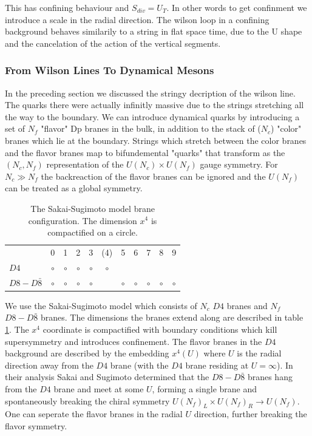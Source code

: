 \documentclass[11pt,a4paper]{article}
\begin{document}
This has confining behaviour and $S_{div}=U_T$. In other words to get confinment we introduce a scale in the radial direction. The wilson loop in a confining background behaves similarily to a string in flat space time, due to the U shape and the cancelation of the action of the vertical segments.

\FloatBarrier
\subsubsection{From Wilson Lines To Dynamical Mesons}

In the preceding section we discussed the stringy decription of the wilson line. The quarks there were actually infinitly massive due to the strings stretching all the way to the boundary. We can introduce dynamical quarks by introducing a set of $N_f$ "flavor" Dp branes in the bulk, in addition to the stack of ($N_c$) "color" branes which lie at the boundary. Strings which stretch between the color branes and the flavor branes map to bifundemental "quarks" that transform as the $(N_c,N_f)$ representation of the $U(N_c)\times U(N_f)$ gauge symmetry. For $N_c\gg N_f$ the backreaction of the flavor branes can be ignored and the $U(N_f)$ can be treated as a global symmetry.

\begin{table}
\centering
\begin{tabular}{ l *{10}{c}}
 	& 0 & 1 & 2 & 3 & (4) & 5 & 6 & 7 & 8 & 9 \\
$D4$	 & $\circ$ & $\circ$ & $\circ$ & $\circ$ & $\circ$ &  &  &  &  & \\
$D8-D\bar{8}$	& $\circ$ & $\circ$ & $\circ$ & $\circ$ &  & $\circ$ & $\circ$ & $\circ$ & $\circ$ & $\circ$
\end{tabular}
\caption{The Sakai-Sugimoto model brane configuration. The dimension $x^4$ is compactified on a circle.}
\label{tab:Sakai-Sugimoto}
\end{table}

We use the Sakai-Sugimoto model \cite{Sakai04} which consists of $N_c$ $D4$ branes and $N_f$ $D8-D\bar{8}$ branes. The dimensions the branes extend along are described in table \ref{tab:Sakai-Sugimoto}. The $x^4$ coordinate is compactified with boundary conditions which kill supersymmetry and introduces confinement. The flavor branes in the $D4$ background are described by the embedding $x^4\left(U\right)$ where $U$ is the radial direction away from the $D4$ brane (with the $D4$ brane residing at $U=\infty$). In their analysis Sakai and Sugimoto determined that the $D8-D\bar{8}$ branes hang from the $D4$ brane and meet at  some $U$, forming a single brane and spontaneously breaking the chiral symmetry $U\left(N_f\right)_L\times U\left(N_f\right)_R\rightarrow U\left(N_f\right)$. One can seperate the flavor branes in the radial $U$ direction, further breaking the flavor symmetry.
\end{document}
